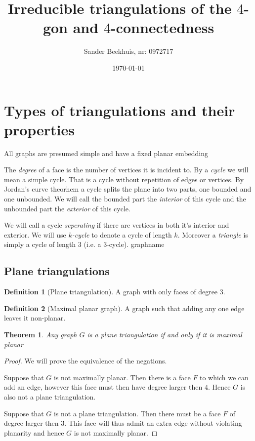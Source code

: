 \documentclass[a4paper]{article}
\title{Irreducible triangulations of the $4$-gon and $4$-connectedness }
\author{Sander Beekhuis, nr: 0972717}
\date{\today} %
\newtheorem{thrm}{Theorem}
\theoremstyle{definition}
\newtheorem*{defi}{Definition}
\newcommand{\ifftext}{if and only if }
\begin{document}
\maketitle

\section{Types of triangulations and their properties}

All graphs are presumed simple and have a fixed planar embedding

The \emph{degree} of a face is the number of vertices it is incident to. By a \emph{cycle} we will mean a simple cycle. That is a cycle without repetition of edges or vertices. By Jordan's curve theorhem a cycle splits the plane into two parts, one bounded and one unbounded. %
We will call the bounded part the \emph{interior} of this cycle and the unbounded part the \emph{exterior} of this cycle.

We will call a cycle \emph{seperating} if there are vertices in both it's interior and exterior. We will use \emph{$k$-cycle} to denote a cycle of length $k$. Moreover a \emph{triangle} is simply a cycle of length $3$ (i.e. a $3$-cycle). graphname


\subsection{Plane triangulations}

\begin{defi} [Plane triangulation]
A graph with only faces of degree $3$.
\end{defi}


\begin{defi} [Maximal planar graph]
A graph such that adding any one edge leaves it non-planar.
\end{defi}

\begin{thrm}
Any graph $G$ is a plane triangulation \ifftext it is maximal planar
\end{thrm}

\begin{proof}
We will prove the equivalence of the negations.

Suppose that $G$ is not maximally planar. Then there is a face $F$ to which we can add an edge, however this face must then have degree larger then $4$. Hence $G$ is also not a plane triangulation. 

Suppose that $G$ is not a plane triangulation. Then there must be a face $F$ of degree larger then $3$. This face will thus admit an extra edge without violating planarity and hence $G$ is not maximally planar.
\end{proof}
\end{document}
